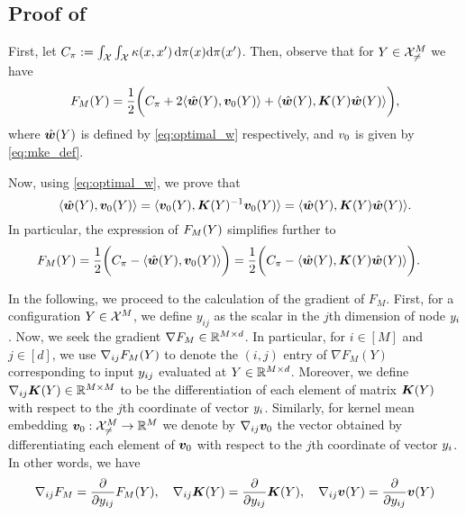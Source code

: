 \subsection{Proof of \texorpdfstring{}{Theorem \ref{thm:gradient_opt_mmd}}}\label{proof:thm_gradient_opt_mmd}

First, let $C_\pi := \int_{\mathcal{X}} \int_{\mathcal{X}} \kappa(x,x^{\prime}) \,\mathrm{d}\pi(x) \mathrm{d}\pi(x^{\prime})$. Then, observe that for $Y\in \mathcal{X}_{\neq}^{M}$ we have
\begin{equation}
    F_{M}(Y) = \frac{1}{2} \bigg( C_\pi + 2 \langle \hat{\bm{w}}(Y), \bm{v}_{0}(Y) \rangle + \langle \hat{\bm{w}}(Y), \bm{K}(Y) \hat{\bm{w}}(Y) \rangle  \bigg),
\end{equation}
where $\hat{\bm{w}}(Y)$ is defined by \eqref{eq:optimal_w}  respectively, and $v_{0}$ is given by \eqref{eq:mke_def}.

Now, using \eqref{eq:optimal_w}, we prove that
\begin{equation}\label{eq:kernel_ids}
    \langle \hat{\bm{w}}(Y), \bm{v}_{0}(Y) \rangle = \langle \bm{v}_{0}(Y), \bm{K}(Y)^{-1} \bm{v}_{0}(Y) \rangle = \langle \hat{\bm{w}}(Y), \bm{K}(Y) \hat{\bm{w}}(Y) \rangle.
\end{equation}
In particular, the expression of $F_{M}(Y)$ simplifies further to 
\begin{align*}
    F_{M}(Y) & = \frac{1}{2} \bigg(C_\pi - \langle \hat{\bm{w}}(Y), \bm{v}_{0}(Y) \rangle \bigg) = \frac{1}{2} \bigg( C_\pi - \langle \hat{\bm{w}}(Y), \bm{K}(Y) \hat{\bm{w}}(Y) \rangle \bigg).
\end{align*}


In the following, we proceed to the calculation of the gradient of $F_{M}$. First, for a configuration $Y\in\mathcal{X}^M$, we define $y_{ij}$ as the scalar in the $j$th dimension of node $y_{i}$. Now, we seek the gradient $\nabla F_{M}\in\mathbb{R}^{M\times d}$. In particular, for $i \in [M]$ and $j \in [d]$, we use $\nabla_{ij} F_{M}(Y)$ to denote the $(i,j)$ entry of $\nabla F_{M}(Y)$ corresponding to input $y_{ij}$ evaluated at $Y\in\mathbb{R}^{M \times d}$. 
Moreover, we define $\nabla_{ij} \bm{K}(Y)\in\mathbb{R}^{M\times M}$  to be the differentiation of each element of matrix $\bm{K}(Y)$ with respect to the $j$th coordinate of vector $y_{i}$. Similarly, for kernel mean embedding $\bm{v}_{0}: \mathcal{X}_{\neq}^{M} \rightarrow \mathbb{R}^{M}$ we denote by $\nabla_{ij} \bm{v}_{0}$ the vector obtained by differentiating each element of $\bm{v}_{0}$ with respect to the $j$th coordinate of vector $y_{i}$. In other words, we have
\begin{equation}
    \nabla_{ij} F_{M} = \frac{\partial}{\partial y_{ij}} F_{M}(Y),\quad \nabla_{ij} \bm{K}(Y) = \frac{\partial}{\partial y_{ij}} \bm{K}(Y) , \quad \nabla_{ij} \bm{v}(Y) = \frac{\partial}{\partial y_{ij}} \bm{v}(Y)
\end{equation}



